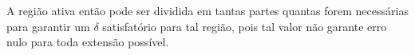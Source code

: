 A região ativa então pode ser dividida em 
tantas partes quantas forem necessárias 
para garantir um $\delta$ satisfatório para tal região,
pois tal valor não garante erro nulo para toda extensão
possível.

